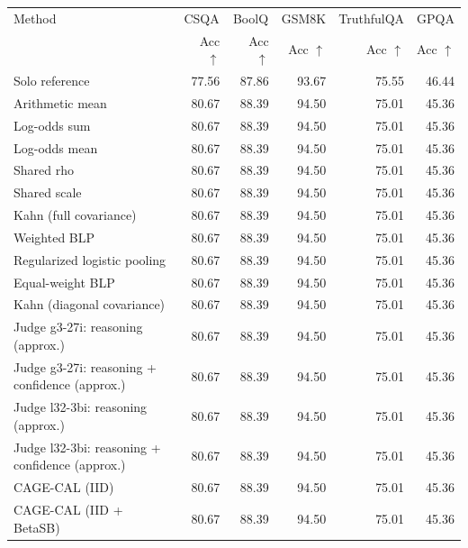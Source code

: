 \begin{tabular}{lrrrrr}
\toprule
Method & \multicolumn{1}{c}{CSQA} & \multicolumn{1}{c}{BoolQ} & \multicolumn{1}{c}{GSM8K} & \multicolumn{1}{c}{TruthfulQA} & \multicolumn{1}{c}{GPQA} \\
 & Acc $\uparrow$ & Acc $\uparrow$ & Acc $\uparrow$ & Acc $\uparrow$ & Acc $\uparrow$ \\
\midrule
Solo reference & 77.56 & 87.86 & 93.67 & 75.55 & 46.44 \\
Arithmetic mean & 80.67 & 88.39 & 94.50 & 75.01 & 45.36 \\
Log-odds sum & 80.67 & 88.39 & 94.50 & 75.01 & 45.36 \\
Log-odds mean & 80.67 & 88.39 & 94.50 & 75.01 & 45.36 \\
Shared rho & 80.67 & 88.39 & 94.50 & 75.01 & 45.36 \\
Shared scale & 80.67 & 88.39 & 94.50 & 75.01 & 45.36 \\
Kahn (full covariance) & 80.67 & 88.39 & 94.50 & 75.01 & 45.36 \\
Weighted BLP & 80.67 & 88.39 & 94.50 & 75.01 & 45.36 \\
Regularized logistic pooling & 80.67 & 88.39 & 94.50 & 75.01 & 45.36 \\
Equal-weight BLP & 80.67 & 88.39 & 94.50 & 75.01 & 45.36 \\
Kahn (diagonal covariance) & 80.67 & 88.39 & 94.50 & 75.01 & 45.36 \\
Judge g3-27i: reasoning (approx.) & 80.67 & 88.39 & 94.50 & 75.01 & 45.36 \\
Judge g3-27i: reasoning + confidence (approx.) & 80.67 & 88.39 & 94.50 & 75.01 & 45.36 \\
Judge l32-3bi: reasoning (approx.) & 80.67 & 88.39 & 94.50 & 75.01 & 45.36 \\
Judge l32-3bi: reasoning + confidence (approx.) & 80.67 & 88.39 & 94.50 & 75.01 & 45.36 \\
CAGE-CAL (IID) & 80.67 & 88.39 & 94.50 & 75.01 & 45.36 \\
CAGE-CAL (IID + BetaSB) & 80.67 & 88.39 & 94.50 & 75.01 & 45.36 \\
\bottomrule
\end{tabular}
